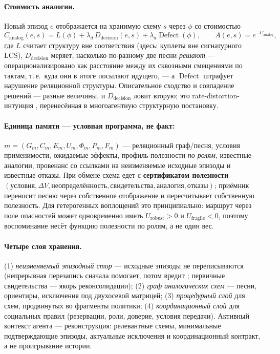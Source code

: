\documentclass{article}
\begin{document}
\paragraph{Стоимость аналогии.} Новый эпизод $e$ отображается на
хранимую схему $s$ через $\phi$ со стоимостью
\[
C_{\mathrm{analog}}(e,s) = L(\phi) + \lambda_d\,
D_{\mathrm{decision}}(e,s) + \lambda_a \operatorname{Defect}(\phi),
\qquad A(e,s) = e^{-C_{\mathrm{analog}}},
\]
где $L$ считает структуру вне соответствия (здесь: куплеты вне
сигнатурного LCS), $D_{\mathrm{decision}}$ меряет, насколько
по-разному две песни \emph{решают} --- операционализировано как
расстояние между их сквозными смещениями по тактам, т.\,е.\ куда они
в итоге посылают идущего, --- а $\operatorname{Defect}$ штрафует
нарушение реляционной структуры. Описательное сходство и совпадение
решений --- разные величины, и $D_{\mathrm{decision}}$ ловит вторую;
это rate-distortion-интуиция \citet{rdd2026}, перенесённая в
многоагентную структурную постановку.

\paragraph{Единица памяти --- условная программа, не факт:}
$m = (G_m, C_m, E_m, U_m, \Phi_m, P_m, F_m)$ --- реляционный
граф/песня, условия применимости, ожидаемые эффекты, профиль
полезности \emph{по ролям}, известные аналогии, провенанс со ссылками
на неизменяемые исходные эпизоды и известные отказы. При обмене схема
едет с \textbf{сертификатом полезности} $(\text{условия}, \Delta V,
\text{неопределённость}, \text{свидетельства}, \text{аналогия},
\text{отказы})$; приёмник переносит песню через собственное
отображение и пересчитывает собственную полезность. Для гетерогенных
воплощений это принципиально: маршрут через поле опасностей может
одновременно иметь $U_{\mathrm{robust}} > 0$ и
$U_{\mathrm{fragile}} < 0$, поэтому воспоминание несёт функцию
полезности по ролям, а не один вес.

\paragraph{Четыре слоя хранения.} (1) \emph{неизменяемый эпизодный
стор} --- исходные эпизоды не переписываются (непрерывная перезапись
сначала помогает, потом вредит \citep{faulty2026}; первичные
свидетельства --- якорь реконсолидации); (2) \emph{граф аналогических
схем} --- песни, ориентиры, исключения под двухосевой матрицей;
(3) \emph{процедурный слой} для схем, продвинутых во фрагменты
политики; (4) \emph{координационный слой} для социальных правил
(резервации, роли, доверие, условия передачи). Активный контекст
агента --- реконструкция: релевантные схемы, минимальные
подтверждающие эпизоды, актуальные исключения и координационный
контракт, а не проигрывание истории.
\end{document}
